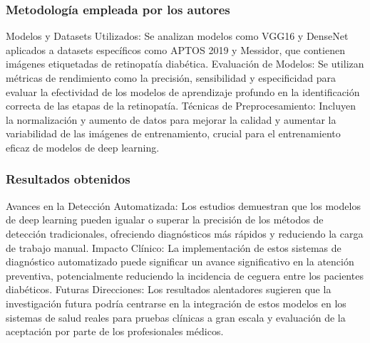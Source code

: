 \subsubsection{Metodología empleada por los autores}

Modelos y Datasets Utilizados: Se analizan modelos como VGG16 y DenseNet aplicados a datasets específicos como APTOS 2019 y Messidor, que contienen imágenes etiquetadas de retinopatía diabética.
Evaluación de Modelos: Se utilizan métricas de rendimiento como la precisión, sensibilidad y especificidad para evaluar la efectividad de los modelos de aprendizaje profundo en la identificación correcta de las etapas de la retinopatía.
Técnicas de Preprocesamiento: Incluyen la normalización y aumento de datos para mejorar la calidad y aumentar la variabilidad de las imágenes de entrenamiento, crucial para el entrenamiento eficaz de modelos de deep learning.

\subsubsection{Resultados obtenidos}

Avances en la Detección Automatizada: Los estudios demuestran que los modelos de deep learning pueden igualar o superar la precisión de los métodos de detección tradicionales, ofreciendo diagnósticos más rápidos y reduciendo la carga de trabajo manual.
Impacto Clínico: La implementación de estos sistemas de diagnóstico automatizado puede significar un avance significativo en la atención preventiva, potencialmente reduciendo la incidencia de ceguera entre los pacientes diabéticos.
Futuras Direcciones: Los resultados alentadores sugieren que la investigación futura podría centrarse en la integración de estos modelos en los sistemas de salud reales para pruebas clínicas a gran escala y evaluación de la aceptación por parte de los profesionales médicos.

 